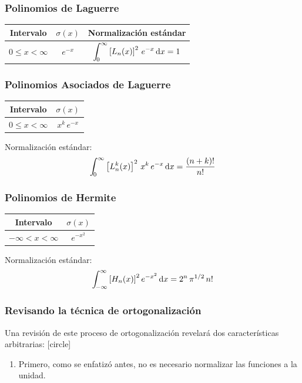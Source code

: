\documentclass[12pt]{beamer}
\begin{document}
\begin{frame}
\frametitle{Polinomios de Laguerre}
\begin{table}
\begin{tabular}{c c c}
Intervalo & $\sigma (x)$ & Normalización estándar \\ \hline
$0 \leq x < \infty $ & $e^{-x}$ & $\displaystyle \scaleint{5ex}_{\bs 0}^{\infty} \left[ L_{n} (x) \right]^{2} \, e^{-x} \dd{x} =  1 $
\end{tabular}
\end{table}
\end{frame}
\begin{frame}
\frametitle{Polinomios Asociados de Laguerre}
\begin{table}
\begin{tabular}{c c}
Intervalo & $\sigma (x)$ \\ \hline
$0 \leq x < \infty $ & $x^{k} \, e^{-x}$ \\ \hline
\end{tabular}
\end{table}
Normalización estándar:
\begin{align*}
\scaleint{5ex}_{\bs 0}^{\infty} \left[ L_{n}^{k} (x) \right]^{2} \, x^{k} \, e^{-x} \dd{x} = \dfrac{(n + k)!}{n!}
\end{align*}
\end{frame}
\begin{frame}
\frametitle{Polinomios de Hermite}
\begin{table}
\begin{tabular}{c c}
Intervalo & $\sigma (x)$ \\ \hline
$- \infty < x < \infty $ & $e^{-x^{2}}$ \\ \hline
\end{tabular}
\end{table}
Normalización estándar:
\begin{align*}
\scaleint{5ex}_{\bs -\infty}^{\infty} \left[ H_{n} (x) \right]^{2} e^{-x^{2}} \dd{x} = 2^{n} \, \pi^{1/2} \, n!
\end{align*}
\end{frame}
\begin{frame}
\frametitle{Revisando la técnica de ortogonalización}
Una revisión de este proceso de ortogonalización revelará dos características arbitrarias:
\pause
{}
[circle]
\begin{enumerate}[<+->]
\item Primero, como se enfatizó antes, no es necesario normalizar las funciones a la unidad. 
\seti
\end{enumerate}
\end{frame}
\end{document}

